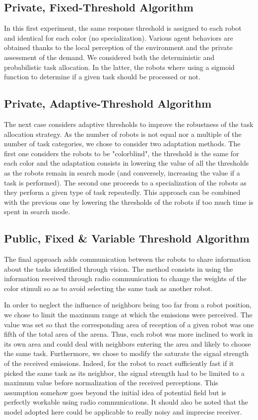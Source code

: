 \subsection{Private, Fixed-Threshold Algorithm}
In this first experiment, the same response threshold is assigned to each robot and identical for each color (no specialization). Various agent behaviors are obtained thanks to the local perception of the environment and the private assessment of the demand. We considered both the deterministic and probabilistic task allocation. In the latter, the robots where using a sigmoid function to determine if a given task should be processed or not.

\subsection{Private, Adaptive-Threshold Algorithm}
The next case considers adaptive thresholds to improve the robustness of the task allocation strategy. As the number of robots is not equal nor a multiple of the number of task categories, we chose to consider two adaptation methods. The first one considers the robots to be "colorblind", the threshold is the same for each color and the adaptation consists in lowering the value of all the thresholds as the robots remain in search mode (and conversely, increasing the value if a task is performed). The second one proceeds to a specialization of the robots as they perform a given type of task repeatedly. This approach can be combined with the previous one by lowering the thresholds of the robots if too much time is spent in search mode.

\subsection{Public, Fixed \& Variable Threshold Algorithm}
The final approach adds communication between the robots to share information about the tasks identified through vision. The method consists in using the information received through radio communication to change the weights of the color stimuli so as to avoid selecting the same task as another robot.

In order to neglect the influence of neighbors being too far from a robot position, we chose to limit the maximum range at which the emissions were perceived. The value was set so that the corresponding area of reception of a given robot was one fifth of the total area of the arena. Thus, each robot was more inclined to work in its own area and could deal with neighbors entering the area and likely to choose the same task. Furthermore, we chose to modify the saturate the signal strength of the received emissions. Indeed, for the robot to react sufficiently fast if it picked the same task as its neighbor, the signal strength had to be limited to a maximum value before normalization of the received perceptions. This assumption somehow goes beyond the initial idea of potential field but is perfectly workable using radio communications. It should also be noted that the model adopted here could be applicable to really noisy and imprecise receiver.

